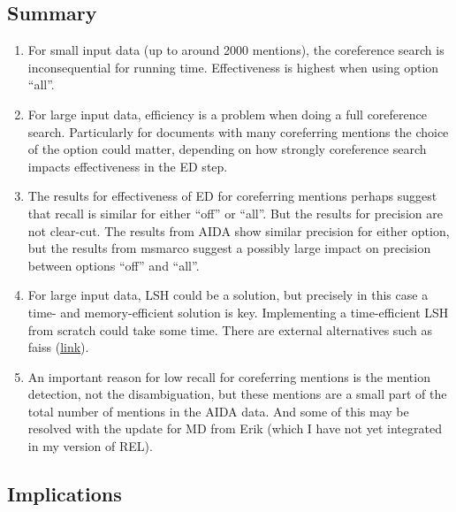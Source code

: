 \documentclass[a4paper,11pt]{article}
\numberwithin{equation}{section} %
\begin{document}
\subsection{Summary}
\begin{enumerate}
 \item For small input data (up to around 2000 mentions), the coreference search is inconsequential for running time. Effectiveness is highest when using option ``all''.
 \item For large input data, efficiency is a problem when doing a full coreference search. Particularly for documents with many coreferring mentions the choice of the option could matter, depending on how strongly coreference search impacts effectiveness in the ED step. 
 \item The results for effectiveness of ED for coreferring mentions perhaps suggest that recall is similar for either ``off'' or ``all''. But the results for precision are not clear-cut. The results from AIDA show similar precision for either option, but the results from msmarco suggest a possibly large impact on precision between options ``off'' and ``all''.
 \item For large input data, LSH could be a solution, but precisely in this case a time- and memory-efficient solution is key. Implementing a time-efficient LSH from scratch could take some time. There are external alternatives such as faiss (\href{https://github.com/facebookresearch/faiss}{\underline{link}}).
 \item An important reason for low recall for coreferring mentions is the mention detection, not the disambiguation, but these mentions are a small part of the total number of mentions in the AIDA data. And some of this may be resolved with the update for MD from Erik (which I have not yet integrated in my version of REL).
\end{enumerate}

\subsection{Implications}
\end{document}
